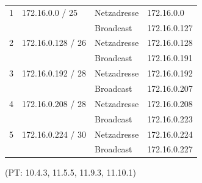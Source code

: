 \begin{table}[H]
	\begin{tabular}{llll}
		1 & 172.16.0.0 / 25 & Netzadresse & 172.16.0.0 \\
		&  & Broadcast & 172.16.0.127 \\
		\hline
		2 & 172.16.0.128 / 26 & Netzadresse & 172.16.0.128 \\
		&  & Broadcast & 172.16.0.191 \\
		\hline
		3 & 172.16.0.192 / 28 & Netzadresse & 172.16.0.192 \\
		&  & Broadcast & 172.16.0.207 \\
		\hline
		4 & 172.16.0.208 / 28 & Netzadresse & 172.16.0.208 \\
		&  & Broadcast & 172.16.0.223 \\
		\hline
		5 & 172.16.0.224 / 30 & Netzadresse & 172.16.0.224 \\
		&  & Broadcast & 172.16.0.227
	\end{tabular}
\end{table}

(PT: 10.4.3, 11.5.5, 11.9.3, 11.10.1)






